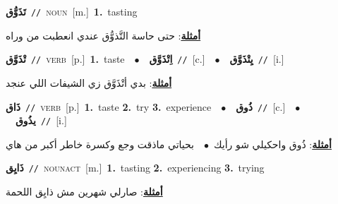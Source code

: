 \documentclass[10pt,a4paper,twoside]{article} %
\begin{document}
\begin{multicols}{2}
{\setlength\topsep{0pt}\textbf{\foreignlanguage{arabic}{تَذَوُّق}}\ {\color{gray}\texttt{//}\color{black}}\ \textsc{noun}\ [m.]\ \textbf{1.}~tasting\  \begin{flushright}\color{gray}\foreignlanguage{arabic}{\textbf{\underline{\foreignlanguage{arabic}{أمثلة}}}: حتى حاسة التَّذوُّق عندي انعطبت من وراه}\end{flushright}\color{black}} \vspace{2mm}

{\setlength\topsep{0pt}\textbf{\foreignlanguage{arabic}{تْذَوَّق}}\ {\color{gray}\texttt{//}\color{black}}\ \textsc{verb}\ [p.]\ \textbf{1.}~taste\ \ $\bullet$\ \ \setlength\topsep{0pt}\textbf{\foreignlanguage{arabic}{اِتْذَوَّق}}\ {\color{gray}\texttt{//}\color{black}}\ [c.]\ \ $\bullet$\ \ \setlength\topsep{0pt}\textbf{\foreignlanguage{arabic}{يِتْذَوَّق}}\ {\color{gray}\texttt{//}\color{black}}\ [i.]\  \begin{flushright}\color{gray}\foreignlanguage{arabic}{\textbf{\underline{\foreignlanguage{arabic}{أمثلة}}}: بدي أتْذَوَّق زي الشيفات اللي عنجد}\end{flushright}\color{black}} \vspace{2mm}

{\setlength\topsep{0pt}\textbf{\foreignlanguage{arabic}{ذَاق}}\ {\color{gray}\texttt{//}\color{black}}\ \textsc{verb}\ [p.]\ \textbf{1.}~taste  \textbf{2.}~try  \textbf{3.}~experience\ \ $\bullet$\ \ \setlength\topsep{0pt}\textbf{\foreignlanguage{arabic}{ذُوق}}\ {\color{gray}\texttt{//}\color{black}}\ [c.]\ \ $\bullet$\ \ \setlength\topsep{0pt}\textbf{\foreignlanguage{arabic}{يذُوق}}\ {\color{gray}\texttt{//}\color{black}}\ [i.]\  \begin{flushright}\color{gray}\foreignlanguage{arabic}{\textbf{\underline{\foreignlanguage{arabic}{أمثلة}}}: ذُوق واحكيلي شو رأيك\ $\bullet$\ \  بحياتي ماذقت وجع وكسرة خاطر أكبر من هاي}\end{flushright}\color{black}} \vspace{2mm}

{\setlength\topsep{0pt}\textbf{\foreignlanguage{arabic}{ذَايِق}}\ {\color{gray}\texttt{//}\color{black}}\ \textsc{noun\textunderscore act}\ [m.]\ \textbf{1.}~tasting  \textbf{2.}~experiencing  \textbf{3.}~trying\  \begin{flushright}\color{gray}\foreignlanguage{arabic}{\textbf{\underline{\foreignlanguage{arabic}{أمثلة}}}: صارلي شهرين مش ذايِق اللحمة}\end{flushright}\color{black}} \vspace{2mm}


\end{multicols}
\end{document}
